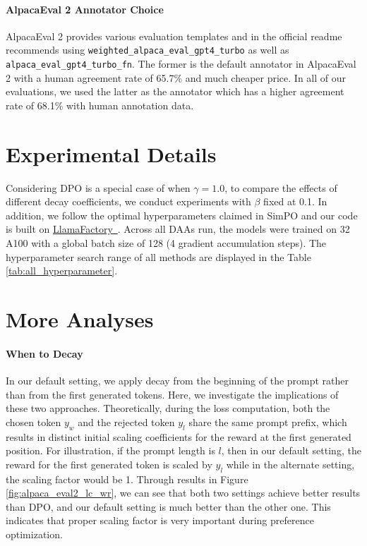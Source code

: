 \vspace{-0.25cm}
\paragraph{AlpacaEval 2 Annotator Choice}
AlpacaEval 2 provides various evaluation templates and in the official readme recommends using \texttt{weighted\_alpaca\_eval\_gpt4\_turbo} as well as \texttt{alpaca\_eval\_gpt4\_turbo\_fn}. The former is the default annotator in AlpacaEval 2 with a human agreement rate of 65.7\% and much cheaper price. In all of our evaluations, we used the latter as the annotator which has a higher agreement rate of 68.1\% with human annotation data.

\section{Experimental Details}
\label{sec:exp_details}
Considering DPO is a special case of \method when $\gamma=1.0$, to compare the effects of different decay coefficients, we conduct experiments with $\beta$ fixed at 0.1. In addition, we follow the optimal hyperparameters claimed in SimPO and our code is built on \href{https://github.com/hiyouga/LLaMA-Factory}{LlamaFactory~\citep{zheng2024llamafactory}}. Across all DAAs run, the models were trained on 32 A100 with a global batch size of 128 (4 gradient accumulation steps). The hyperparameter search range of all methods are displayed in the Table \ref{tab:all_hyperparameter}.



\section{More Analyses}
\paragraph{When to Decay}
In our default setting, we apply decay from the beginning of the prompt rather than from the first generated tokens. Here, we investigate the implications of these two approaches. Theoretically, during the loss computation, both the chosen token $y_w$ and the rejected token $y_l$ share the same prompt prefix, which results in distinct initial scaling coefficients for the reward at the first generated position. For illustration, if the prompt length is $l$, then in our default setting, the reward for the first generated token is scaled by $y_l$ while in the alternate setting, the scaling factor would be 1. Through results in Figure \ref{fig:alpaca_eval2_lc_wr}, we can see that both two settings achieve better results than DPO, and our default setting is much better than the other one. This indicates that proper scaling factor is very important during preference optimization.

